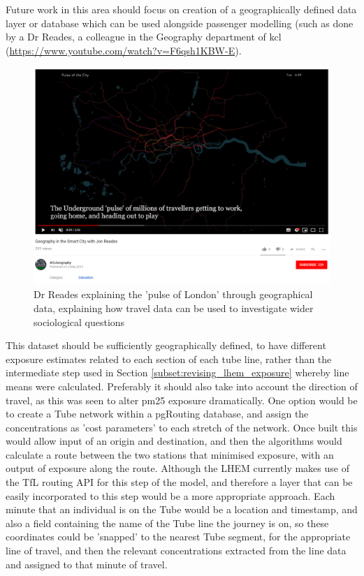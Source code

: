 
Future work in this area should focus on creation of a geographically defined data layer or database which can be used alongside passenger modelling (such as done by a Dr Reades, a colleague in the Geography department of \gls{kcl} (\url{https://www.youtube.com/watch?v=F6qsh1KBW-E}).

\begin{figure}[H]
\centering
\includegraphics[scale=0.4]{images/pulse_of_london.png}
\caption{Dr Reades explaining the 'pulse of London' through geographical data, explaining how travel data can be used to investigate wider sociological questions}
\label{fig:pulse_of_london}
\end{figure}

This dataset should be sufficiently geographically defined, to have different exposure estimates related to each section of each tube line, rather than the intermediate step used in Section \ref{subset:revising_lhem_exposure} whereby line means were calculated. Preferably it should also take into account the direction of travel, as this was seen to alter \gls{pm25} exposure dramatically. One option would be to create a Tube network within a pgRouting database, and assign the concentrations as 'cost parameters' to each stretch of the network. Once built this would allow input of an origin and destination, and then the algorithms would calculate a route between the two stations that minimised exposure, with an output of exposure along the route. Although the LHEM currently makes use of the TfL routing API for this step of the model, and therefore a layer that can be easily incorporated to this step would be a more appropriate approach. Each minute that an individual is on the Tube would be a location and timestamp, and also a field containing the name of the Tube line the journey is on, so these coordinates could be 'snapped' to the nearest Tube segment, for the appropriate line of travel, and then the relevant concentrations extracted from the line data and assigned to that minute of travel.

